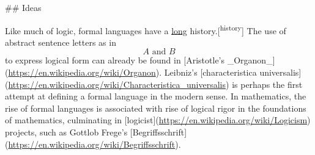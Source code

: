 \documentclass[11pt]{article}
\begin{document}
\#\# Ideas

Like much of logic, formal languages have a \uline{long} history.[\textsuperscript{history}] The use of
abstract sentence letters as in $$A\text{ and }B$$ to express logical form can
already be found in [Aristotle's
\_Organon\_](\url{https://en.wikipedia.org/wiki/Organon}). Leibniz's [characteristica
universalis](\url{https://en.wikipedia.org/wiki/Characteristica\_universalis}) is
perhaps the first attempt at defining a formal language in the modern sense. In
mathematics, the rise of formal languages is associated with rise of logical
rigor in the foundations of mathematics, culminating in
[logicist](\url{https://en.wikipedia.org/wiki/Logicism}) projects, such as Gottlob
Frege's [Begriffsschrift](\url{https://en.wikipedia.org/wiki/Begriffsschrift}).
\end{document}
